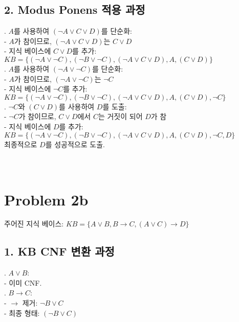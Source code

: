\documentclass[12pt]{article}
\begin{document}
{\subsection*{2. Modus Ponens 적용 과정}

. \(A\)를 사용하여 \( (\neg A \lor C \lor D) \)를 단순화: \\
   - \(A\)가 참이므로, \( (\neg A \lor C \lor D) \)는 \( C \lor D \) \\
   - 지식 베이스에 \( C \lor D \)를 추가: \( KB = \{ (\neg A \lor \neg C), (\neg B \lor \neg C), (\neg A \lor C \lor D), A, (C \lor D) \} \) \\

. \(A\)를 사용하여 \( (\neg A \lor \neg C) \)를 단순화: \\
   - \(A\)가 참이므로, \( (\neg A \lor \neg C) \)는 \( \neg C \) \\
   - 지식 베이스에 \( \neg C \)를 추가: \( KB = \{ (\neg A \lor \neg C), (\neg B \lor \neg C), (\neg A \lor C \lor D), A, (C \lor D), \neg C \} \) \\

. \( \neg C \)와 \( (C \lor D) \)를 사용하여 \( D \)를 도출: \\
   - \( \neg C \)가 참이므로, \( C \lor D \)에서 \( C \)는 거짓이 되어 \( D \)가 참 \\
   - 지식 베이스에 \( D \)를 추가: \( KB = \{ (\neg A \lor \neg C), (\neg B \lor \neg C), (\neg A \lor C \lor D), A, (C \lor D), \neg C, D \} \) \\

\noindent 최종적으로 \(D\)를 성공적으로 도출. \\ \\ \\ 

\section*{Problem 2b}

주어진 지식 베이스: \( KB = \{ A \lor B, B \rightarrow C, (A \lor C) \rightarrow D \} \)

\subsection*{1. KB CNF 변환 과정}

. \( A \lor B \): \\
   - 이미 CNF. \\

. \( B \rightarrow C \): \\
   - \(\rightarrow\) 제거: \(\neg B \lor C\) \\
   - 최종 형태: \((\neg B \lor C)\) \\

}
\end{document}
